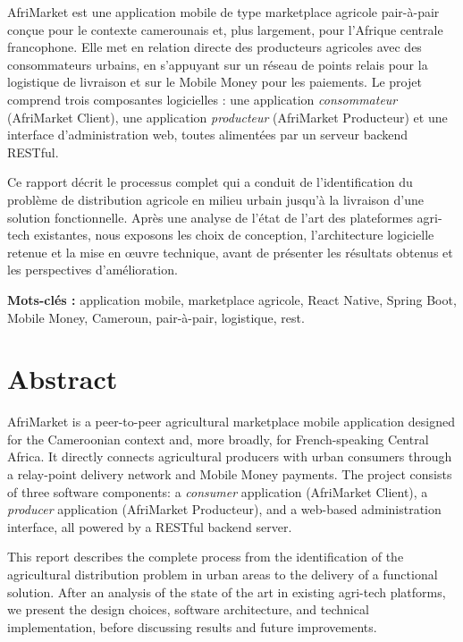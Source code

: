 \documentclass[12pt, a4paper, oneside]{report}
\begin{document}
AfriMarket est une application mobile de type marketplace agricole pair-à-pair conçue pour
le contexte camerounais et, plus largement, pour l'Afrique centrale francophone. Elle met
en relation directe des producteurs agricoles avec des consommateurs urbains, en s'appuyant
sur un réseau de points relais pour la logistique de livraison et sur le Mobile Money pour
les paiements. Le projet comprend trois composantes logicielles : une application
\emph{consommateur} (AfriMarket Client), une application \emph{producteur} (AfriMarket
Producteur) et une interface d'administration web, toutes alimentées par un serveur backend
RESTful.

Ce rapport décrit le processus complet qui a conduit de l'identification du problème de
distribution agricole en milieu urbain jusqu'à la livraison d'une solution fonctionnelle.
Après une analyse de l'état de l'art des plateformes agri-tech existantes, nous exposons
les choix de conception, l'architecture logicielle retenue et la mise en œuvre technique,
avant de présenter les résultats obtenus et les perspectives d'amélioration.

\vspace{1em}
\noindent\textbf{Mots-clés :} application mobile, marketplace agricole, React Native,
Spring Boot, Mobile Money, Cameroun, pair-à-pair, logistique, \gls{rest}.

\chapter*{Abstract}

AfriMarket is a peer-to-peer agricultural marketplace mobile application designed for the
Cameroonian context and, more broadly, for French-speaking Central Africa. It directly
connects agricultural producers with urban consumers through a relay-point delivery network
and Mobile Money payments. The project consists of three software components: a
\emph{consumer} application (AfriMarket Client), a \emph{producer} application (AfriMarket
Producteur), and a web-based administration interface, all powered by a RESTful backend
server.

This report describes the complete process from the identification of the agricultural
distribution problem in urban areas to the delivery of a functional solution. After an
analysis of the state of the art in existing agri-tech platforms, we present the design
choices, software architecture, and technical implementation, before discussing results and
future improvements.
\end{document}
